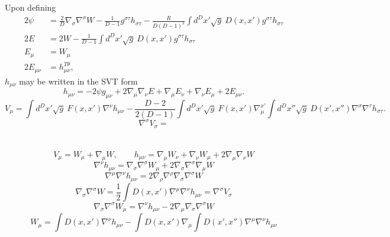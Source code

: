 \documentclass[10pt,letterpaper]{article}
\begin{document}
Upon defining
\begin{align}
2\psi &= \frac{2}{D} \nabla_\sigma \nabla^\sigma W - \frac{1}{D-1}g^{\sigma\tau}h_{\sigma\tau} - \frac{R}{D(D-1)^2} \int d^Dx' \sqrt{g}\ D(x,x') g^{\sigma\tau}h_{\sigma\tau}
\nonumber\\
2E &= 2W - \frac{1}{D-1}  \int d^Dx' \sqrt{g}\ D(x,x') g^{\sigma\tau}h_{\sigma\tau}
\nonumber\\
E_\mu &= W_\mu
\nonumber\\
2 E_{\mu\nu} &= h^{T\theta}_{\mu\nu},
\end{align}
$h_{\mu\nu}$ may be written in the SVT form
\begin{equation}
h_{\mu\nu} = -2\psi g_{\mu\nu} +2 \nabla_\mu \nabla_\nu E + \nabla_\mu E_\nu + \nabla_\nu E_\mu + 2E_{\mu\nu}.
\end{equation}
\begin{equation}
V_\mu =   \int d^Dx' \sqrt{g}\ F(x,x') \nabla^\nu h_{\mu\nu}- \frac{D-2}{2(D-1)}  \int d^Dx' \sqrt{g}\ F(x,x') \nabla_\mu^{x'}  \int d^Dx'' \sqrt{g}\ D(x',x'')\nabla^\sigma \nabla^\tau h_{\sigma\tau}.
\end{equation}
\begin{equation}
\nabla^\sigma V_{\sigma} = 
\end{equation}
\\ \\
\begin{equation}
V_\mu = W_\mu + \nabla_\mu W,\qquad h_{\mu\nu} = \nabla_\mu W_\nu + \nabla_\nu W_\mu + 2 \nabla_\mu \nabla_\nu W
\end{equation}
\begin{equation}
\nabla^\nu h_{\mu\nu} = \nabla_\sigma \nabla^\sigma W_{\mu} + 2\nabla_\sigma \nabla^\sigma \nabla_\mu W
\end{equation}
\begin{equation}
\nabla^\mu \nabla^\nu h_{\mu\nu} = 2\nabla_\rho \nabla^\rho \nabla_\sigma \nabla^\sigma W
\end{equation}
\begin{equation}
\nabla_\sigma \nabla^\sigma W = \frac12 \int D(x,x') \nabla^\mu \nabla^\nu h_{\mu\nu} = \nabla^\sigma V_\sigma
\end{equation}
\begin{equation}
\nabla_\sigma \nabla^\sigma W_\mu = \nabla^\nu h_{\mu\nu} - 2\nabla_\mu \nabla_\sigma \nabla^\sigma W
\end{equation}
\begin{equation}
W_\mu = \int D(x,x')\nabla^\nu h_{\mu\nu} - \int D(x,x') \nabla_\mu \int D(x',x'')\nabla^\mu \nabla^\nu h_{\mu\nu}
\end{equation}
\end{document}
